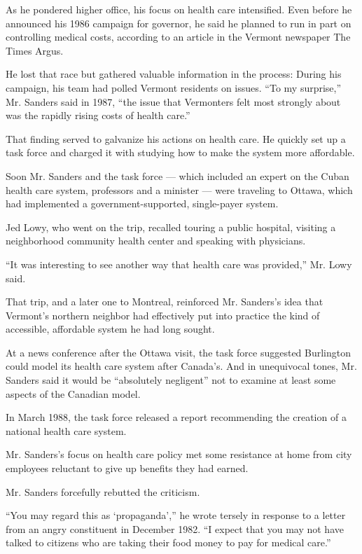 As he pondered higher office, his focus on health care intensified. Even
before he announced his 1986 campaign for governor, he said he planned
to run in part on controlling medical costs, according to an article in
the Vermont newspaper The Times Argus.

He lost that race but gathered valuable information in the process:
During his campaign, his team had polled Vermont residents on issues.
``To my surprise,'' Mr. Sanders said in 1987, ``the issue that
Vermonters felt most strongly about was the rapidly rising costs of
health care.''

That finding served to galvanize his actions on health care. He quickly
set up a task force and charged it with studying how to make the system
more affordable.

Soon Mr. Sanders and the task force --- which included an expert on the
Cuban health care system, professors and a minister --- were traveling
to Ottawa, which had implemented a government-supported, single-payer
system.

Jed Lowy, who went on the trip, recalled touring a public hospital,
visiting a neighborhood community health center and speaking with
physicians.

``It was interesting to see another way that health care was provided,''
Mr. Lowy said.

That trip, and a later one to Montreal, reinforced Mr. Sanders's idea
that Vermont's northern neighbor had effectively put into practice the
kind of accessible, affordable system he had long sought.

At a news conference after the Ottawa visit, the task force suggested
Burlington could model its health care system after Canada's. And in
unequivocal tones, Mr. Sanders said it would be ``absolutely negligent''
not to examine at least some aspects of the Canadian model.

In March 1988, the task force released a report recommending the
creation of a national health care system.

Mr. Sanders's focus on health care policy met some resistance at home
from city employees reluctant to give up benefits they had earned.

Mr. Sanders forcefully rebutted the criticism.

``You may regard this as `propaganda','' he wrote tersely in response to
a letter from an angry constituent in December 1982. ``I expect that you
may not have talked to citizens who are taking their food money to pay
for medical care.''

